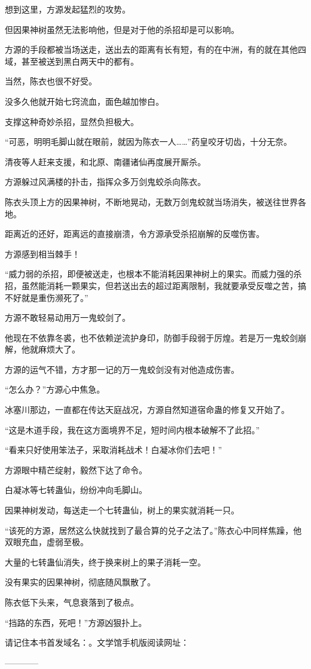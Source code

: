 \begin{this_body}
想到这里，方源发起猛烈的攻势。

但因果神树虽然无法影响他，但是对于他的杀招却是可以影响。

方源的手段都被当场送走，送出去的距离有长有短，有的在中洲，有的就在其他四域，甚至被送到黑白两天中的都有。

当然，陈衣也很不好受。

没多久他就开始七窍流血，面色越加惨白。

支撑这种奇妙杀招，显然负担极大。

“可恶，明明毛脚山就在眼前，就因为陈衣一人……”药皇咬牙切齿，十分无奈。

清夜等人赶来支援，和北原、南疆诸仙再度展开厮杀。

方源躲过风满楼的扑击，指挥众多万剑鬼蛟杀向陈衣。

陈衣头顶上方的因果神树，不断地晃动，无数万剑鬼蛟就当场消失，被送往世界各地。

距离近的还好，距离远的直接崩溃，令方源承受杀招崩解的反噬伤害。

方源感到相当棘手！

“威力弱的杀招，即便被送走，也根本不能消耗因果神树上的果实。而威力强的杀招，虽然能消耗一颗果实，但若送出去的超过距离限制，我就要承受反噬之苦，搞不好就是重伤濒死了。”

方源不敢轻易动用万一鬼蛟剑了。

他现在不依靠冬裘，也不依赖逆流护身印，防御手段弱于厉煌。若是万一鬼蛟剑崩解，他就麻烦大了。

方源的运气不错，方才那一记的万一鬼蛟剑没有对他造成伤害。

“怎么办？”方源心中焦急。

冰塞川那边，一直都在传达天庭战况，方源自然知道宿命蛊的修复又开始了。

“这是木道手段，我在这方面境界不足，短时间内根本破解不了此招。”

“看来只好使用笨法子，采取消耗战术！白凝冰你们去吧！”

方源眼中精芒绽射，毅然下达了命令。

白凝冰等七转蛊仙，纷纷冲向毛脚山。

因果神树发动，每送走一个七转蛊仙，树上的果实就消耗一只。

“该死的方源，居然这么快就找到了最合算的兑子之法了。”陈衣心中同样焦躁，他双眼充血，虚弱至极。

大量的七转蛊仙消失，终于换来树上的果子消耗一空。

没有果实的因果神树，彻底随风飘散了。

陈衣低下头来，气息衰落到了极点。

“挡路的东西，死吧！”方源凶狠扑上。

请记住本书首发域名：。文学馆手机版阅读网址：

------------

\end{this_body}

